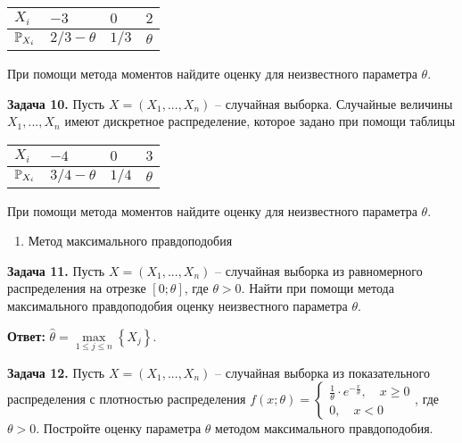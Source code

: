 \begin{tabular}{|p{0.6in}|p{0.6in}|p{0.6in}|p{0.6in}|} \hline 
$X_{i} $ & $-3$ & $0$ & $2$ \\ \hline 
${\rm {\mathbb P}}_{X_{i} } $ & $2/3-\theta $ & $1/3$ & $\theta $ \\ \hline 
\end{tabular}

При помощи метода моментов найдите оценку для неизвестного параметра $\theta $.



\textbf{Задача 10.} Пусть $X=\left(X_{1} ,...,X_{n} \right)$ -- случайная выборка. Случайные величины $X_{1} ,...,X_{n} $ имеют дискретное распределение, которое задано при помощи таблицы

\begin{tabular}{|p{0.6in}|p{0.6in}|p{0.6in}|p{0.6in}|} \hline 
$X_{i} $ & $-4$ & $0$ & $3$ \\ \hline 
${\rm {\mathbb P}}_{X_{i} } $ & $3/4-\theta $ & $1/4$ & $\theta $ \\ \hline 
\end{tabular}

При помощи метода моментов найдите оценку для неизвестного параметра $\theta $.



\begin{enumerate}
\item  Метод максимального правдоподобия
\end{enumerate}



\textbf{Задача 11.} Пусть $X=\left(X_{1} ,...,X_{n} \right)$ -- случайная выборка из равномерного распределения на отрезке $\left[0;\theta \right]$, где $\theta >0$. Найти при помощи метода максимального правдоподобия оценку неизвестного параметра $\theta $.

\textbf{Ответ: }$\widehat{\theta }=\mathop{\max }\limits_{1\le j\le n} \left\{X_{j} \right\}$.



\textbf{Задача 12.} Пусть $X=\left(X_{1} ,...,X_{n} \right)$ -- случайная выборка из показательного распределения с плотностью распределения $f\left(x;\theta \right)=\left\{\begin{array}{l} {{\tfrac{1}{\theta }} \cdot e^{-{\tfrac{x}{\theta }} } ,\quad x\ge 0} \\ {0,\quad x<0} \end{array}\right. $, где $\theta >0$. Постройте оценку параметра $\theta $ методом максимального правдоподобия.

